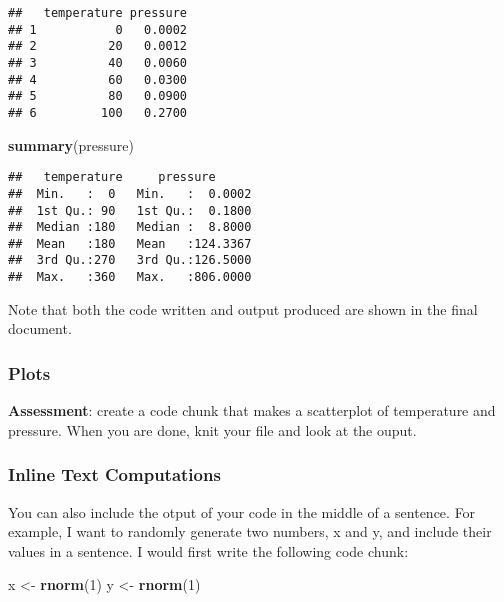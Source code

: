\documentclass[
]{article}
\newenvironment{Shaded}{\begin{snugshade}}{\end{snugshade}}
\newcommand{\DecValTok}[1]{\textcolor[rgb]{0.00,0.00,0.81}{#1}}
\newcommand{\KeywordTok}[1]{\textcolor[rgb]{0.13,0.29,0.53}{\textbf{#1}}}
\newcommand{\NormalTok}[1]{#1}
\newcommand{\StringTok}[1]{\textcolor[rgb]{0.31,0.60,0.02}{#1}}
\begin{document}
\begin{verbatim}
##   temperature pressure
## 1           0   0.0002
## 2          20   0.0012
## 3          40   0.0060
## 4          60   0.0300
## 5          80   0.0900
## 6         100   0.2700
\end{verbatim}

\begin{Shaded}
\begin{Highlighting}[]
\KeywordTok{summary}\NormalTok{(pressure)}
\end{Highlighting}
\end{Shaded}

\begin{verbatim}
##   temperature     pressure       
##  Min.   :  0   Min.   :  0.0002  
##  1st Qu.: 90   1st Qu.:  0.1800  
##  Median :180   Median :  8.8000  
##  Mean   :180   Mean   :124.3367  
##  3rd Qu.:270   3rd Qu.:126.5000  
##  Max.   :360   Max.   :806.0000
\end{verbatim}

Note that both the code written and output produced are shown in the
final document.

\hypertarget{plots}{%
\subsubsection{Plots}\label{plots}}

\textbf{Assessment}: create a code chunk that makes a scatterplot of
temperature and pressure. When you are done, knit your file and look at
the ouput.

\hypertarget{inline-text-computations}{%
\subsubsection{Inline Text
Computations}\label{inline-text-computations}}

You can also include the otput of your code in the middle of a sentence.
For example, I want to randomly generate two numbers, x and y, and
include their values in a sentence. I would first write the following
code chunk:

\begin{Shaded}
\begin{Highlighting}[]
\NormalTok{x <-}\StringTok{ }\KeywordTok{rnorm}\NormalTok{(}\DecValTok{1}\NormalTok{)}
\NormalTok{y <-}\StringTok{ }\KeywordTok{rnorm}\NormalTok{(}\DecValTok{1}\NormalTok{)}
\end{Highlighting}
\end{Shaded}
\end{document}
